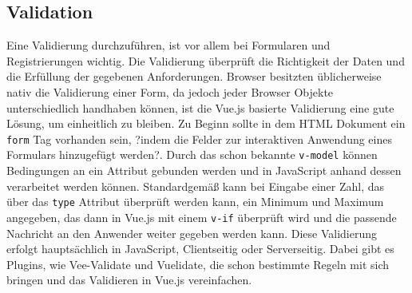 \subsection*{Validation}
Eine Validierung durchzuf\"uhren, ist vor allem bei Formularen und Registrierungen wichtig. Die Validierung \"uberpr\"uft die Richtigkeit der Daten und die Erf\"ullung der gegebenen Anforderungen. Browser besitzten \"ublicherweise nativ die Validierung einer Form, da jedoch jeder Browser Objekte unterschiedlich handhaben k\"onnen, ist die Vue.js basierte Validierung eine gute L\"osung, um einheitlich zu bleiben. Zu Beginn sollte in dem \ac{HTML} Dokument ein \texttt{form} Tag vorhanden sein, ?indem die Felder zur interaktiven Anwendung eines Formulars hinzugef\"ugt werden?. Durch das schon bekannte \texttt{v-model} k\"onnen Bedingungen an ein Attribut gebunden werden und in JavaScript anhand dessen verarbeitet werden k\"onnen.
Standardgem\"a\ss{} kann bei Eingabe einer Zahl, das \"uber das \texttt{type} Attribut \"uberpr\"uft werden kann, ein Minimum und Maximum angegeben, das dann in Vue.js mit einem \texttt{v-if} \"uberpr\"uft wird und die passende Nachricht an den Anwender weiter gegeben werden kann. Diese Validierung erfolgt haupts\"achlich in JavaScript, Clientseitig oder Serverseitig. Dabei gibt es Plugins, wie Vee-Validate und Vuelidate, die schon bestimmte Regeln mit sich bringen und das Validieren in Vue.js vereinfachen\cite{VueDokumentationValidierung2018}.\\

